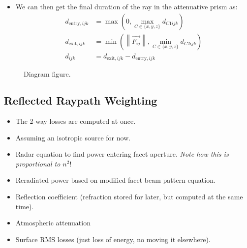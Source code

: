 \documentclass[lettersize,journal]{IEEEtran}
\begin{document}
\begin{itemize}
        \begin{equation}
            \text{Else:}\hspace{1mm}
            d_{C1ijk} = \frac{C_{k\min} - f_{c,i}}{F_{C,ij}}, \hspace{1mm}
            d_{C2ijk} = \frac{C_{k\max} - f_{c,i}}{F_{C,ij}},
        \end{equation}
        
        \begin{equation}
            \text{If } d_{C1ijk} > d_{C2ijk}:\hspace{2mm}
            (d_{C1ijk}, d_{C2ijk}) \leftarrow (d_{C2ijk}, d_{C1ijk}).
    \end{equation}
    \item We can then get the final duration of the ray in the attenuative prism as:
    \begin{align}
        d_{\mathrm{entry},ijk} &= \max\left(0,\max_{C \in \{x,y,z\}} d_{C1ijk}\right) \\
        d_{\mathrm{exit},ijk} &= \min\left(\left\lVert\vec{F_{ij}}\right\rVert,\min_{C \in \{x,y,z\}} d_{C2ijk}\right)\\
        d_{ijk} &= d_{\mathrm{exit},ijk}-d_{\mathrm{entry},ijk}
    \end{align}
\end{itemize}

\begin{figure}

\centering
\caption{Diagram figure.}
\label{fig:diagram}
\end{figure}

\subsection{Reflected Raypath Weighting}

\begin{itemize}
    \item The 2-way losses are computed at once. 
    \item Assuming an isotropic source for now.
    \item Radar equation to find power entering facet aperture. \textit{Note how this is proportional to $n^2$}!
    \item Reradiated power based on modified facet beam pattern equation. 
    \item Reflection coefficient (refraction stored for later, but computed at the same time). 
    \item Atmospheric attenuation
    \item Surface RMS losses (just loss of energy, no moving it elsewhere). 
\end{itemize}
\end{document}
